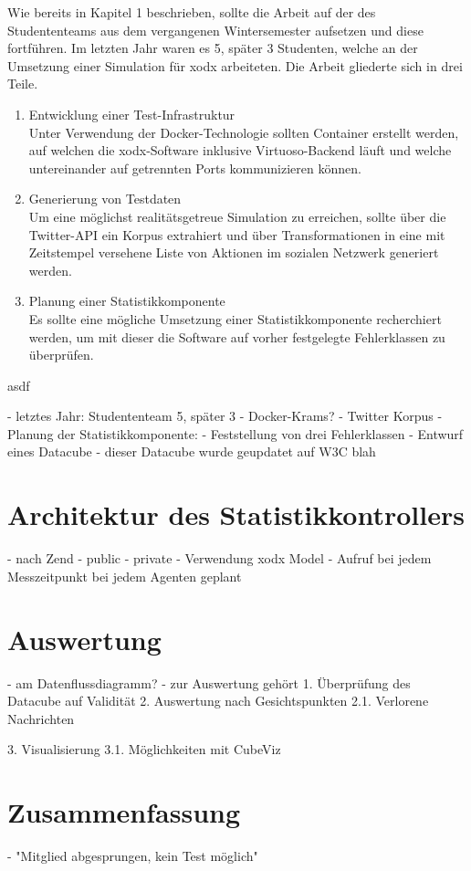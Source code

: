 \documentclass{article}
\begin{document}
Wie bereits in Kapitel 1 beschrieben, sollte die Arbeit auf der des Studententeams aus dem vergangenen Wintersemester aufsetzen und diese fortführen. Im letzten Jahr waren es 5, später 3 Studenten, welche an der Umsetzung einer Simulation für xodx arbeiteten. Die Arbeit gliederte sich in drei Teile.
\begin{enumerate}
	\item{Entwicklung einer Test-Infrastruktur\\
	Unter Verwendung der Docker-Technologie sollten Container erstellt werden, auf welchen die xodx-Software inklusive Virtuoso-Backend läuft und welche untereinander auf getrennten Ports kommunizieren können.}
	\item{Generierung von Testdaten\\
	Um eine möglichst realitätsgetreue Simulation zu erreichen, sollte über die Twitter-API ein Korpus extrahiert und über Transformationen in eine mit Zeitstempel versehene Liste von Aktionen im sozialen Netzwerk generiert werden.}
	\item{Planung einer Statistikkomponente\\
	Es sollte eine mögliche Umsetzung einer Statistikkomponente  recherchiert werden, um mit dieser die Software auf vorher festgelegte Fehlerklassen zu überprüfen.}
\end{enumerate}
asdf

- letztes Jahr: Studententeam 5, später 3
- Docker-Krams?
- Twitter Korpus
- Planung der Statistikkomponente:
	- Feststellung von drei Fehlerklassen
	- Entwurf eines Datacube
- dieser Datacube wurde geupdatet auf W3C blah


\section{Architektur des Statistikkontrollers}

- nach Zend
- public
- private
- Verwendung xodx Model
- Aufruf bei jedem Messzeitpunkt bei jedem Agenten geplant

\section{Auswertung}

- am Datenflussdiagramm?
- zur Auswertung gehört 
1. Überprüfung des Datacube auf Validität
2. Auswertung nach Gesichtspunkten
2.1. Verlorene Nachrichten

3. Visualisierung
3.1. Möglichkeiten mit CubeViz

\section{Zusammenfassung}

- "Mitglied abgesprungen, kein Test möglich"



\end{document}
